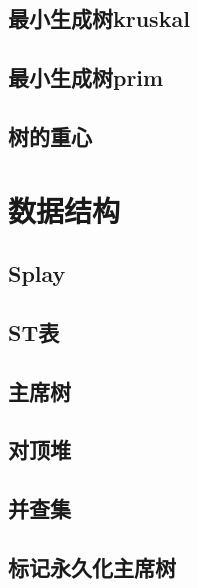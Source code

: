 \documentclass{article}
\begin{document}
\begin{multicols*}{3}
\subsection{最小生成树kruskal}


\subsection{最小生成树prim}


\subsection{树的重心}


\section{数据结构}
\subsection{Splay}


\subsection{ST表}


\subsection{主席树}


\subsection{对顶堆}


\subsection{并查集}


\subsection{标记永久化主席树}



\end{multicols*}
\end{document}
